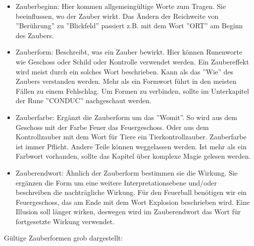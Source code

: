 \documentclass{article}
\begin{document}
\begin{itemize}
\item Zauberbeginn: Hier kommen allgemeingültige Worte zum Tragen. Sie beeinflussen, wo der Zauber wirkt. Das Ändern der Reichweite von ''Berührung'' zu ''Blickfeld'' passiert z.B. mit dem Wort ''ORT'' am Beginn des Zaubers.
\item Zauberform: Beschreibt, was ein Zauber bewirkt. Hier können Runenworte wie Geschoss oder Schild oder Kontrolle verwendet werden. Ein Zaubereffekt wird meist durch ein solches Wort beschrieben. Kann als das ''Wie'' des Zaubers verstanden werden. Mehr als ein Formwort führt in den meisten Fällen zu einem Fehlschlag. Um Formen zu verbinden, sollte im Unterkapitel der Rune ''CONDUC'' nachgeschaut werden.
\item Zauberfarbe: Ergänzt die Zauberform um das ''Womit''. So wird aus dem Geschoss mit der Farbe Feuer das Feuergeschoss. Oder aus dem Kontrollzauber mit dem Wort für Tiere ein Tierkontrollzauber. Zauberfarbe ist immer Pflicht. Andere Teile können weggelassen werden. Ist mehr als ein Farbwort vorhanden, sollte das Kapitel über komplexe Magie gelesen werden.
\item Zauberendwort: Ähnlich der Zauberform bestimmen sie die Wirkung. Sie ergänzen die Form um eine weitere Interpretationsebene und/oder beschreiben die nachträgliche Wirkung. Für den Feuerball benötigen wir ein Feuergeschoss, das am Ende mit dem Wort Explosion beschrieben wird. Eine Illusion soll länger wirken, deswegen wird im Zauberendwort das Wort für fortgesetzte Wirkung verwendet.
\end{itemize}

Gültige Zauberformen grob dargestellt:
\end{document}
